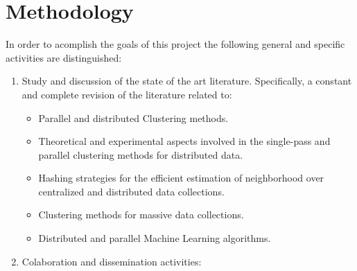 \documentclass[10pt]{article}
\begin{document}
\section{Methodology}\label{sec:metodology}
In order to acomplish the goals of this project the following general and specific activities are distinguished:
\begin{enumerate}
    \item Study and discussion of the state of the art literature. Specifically, a constant and complete revision of the literature related to:
        \begin{itemize}
            \item Parallel and distributed Clustering methods.
            \item Theoretical and experimental aspects involved in the single-pass and parallel clustering methods for distributed data. 
            \item Hashing strategies for the efficient estimation of neighborhood over centralized and distributed data collections.
            \item Clustering methods for massive data collections.
            \item Distributed and parallel Machine Learning algorithms.
        \end{itemize}
    \item Colaboration and dissemination activities:
        \begin{itemize}

\end{itemize}
\end{enumerate}
\end{document}
